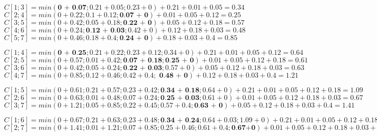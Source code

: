 \documentclass[11pt]{article}
\begin{document}
\bigskip

$C[1; 3] = min(\textbf{0 + 0.07} ; 0.21 + 0.05; 0.23 + 0) + 0.21 + 0.01 + 0.05= 0.34$\\ \smallskip
$C[2; 4] = min(0 + 0.22 ; 0.1 + 0.12; \textbf{0.07 + 0}) + 0.01 + 0.05 + 0.12= 0.25$\\ \smallskip
$C[3; 5] = min(0 + 0.42 ; 0.05 + 0.18; \textbf{0.22 + 0}) + 0.05 + 0.12 + 0.18= 0.57$\\ \smallskip
$C[4; 6] = min(0 + 0.24 ; \textbf{0.12 + 0.03}; 0.42 + 0) + 0.12 + 0.18 + 0.03= 0.48$\\ \smallskip
$C[5; 7] = min(0 + 0.46 ; 0.18 + 0.4 ;\textbf{0.24 + 0}) + 0.18 + 0.03 + 0.4= 0.85$\\

\bigskip

$C[1; 4] = min(\textbf{0 + 0.25} ; 0.21 + 0.22; 0.23 + 0.12;  0.34 + 0) + 0.21 + 0.01 + 0.05 + 0.12= 0.64$\\ \smallskip
$C[2; 5] = min(0 + 0.57 ; 0.01 + 0.42; \textbf{0.07 + 0.18}; \textbf{0.25 + 0}) + 0.01 + 0.05 + 0.12 + 0.18= 0.61$\\ \smallskip
$C[3; 6] = min(0 + 0.42 ; 0.05 + 0.24; \textbf{0.22 + 0.03}; 0.57 + 0) + 0.05 + 0.12 + 0.18 + 0.03= 0.63$\\ \smallskip
$C[4; 7] = min(0 + 0.85 ; 0.12 + 0.46; 0.42 + 0.4 ;\textbf{ 0.48 + 0}) + 0.12 + 0.18 + 0.03 + 0.4 = 1.21$\\

\bigskip

$C[1; 5] = min(0 + 0.61 ; 0.21 + 0.57; 0.23 + 0.42; \textbf{0.34 + 0.18} ; 0.64+0) + 0.21 + 0.01 + 0.05 + 0.12 + 0.18 = 1.09$\\ \smallskip
$C[2; 6] = min(0 + 0.63 ; 0.01 + 0.48; 0.07 + 0.24; \textbf{0.25 + 0.03}; 0.61 +0) + 0.01 + 0.05 + 0.12 + 0.18 +0.03= 0.67$\\ \smallskip
$C[3; 7] = min(0 + 1.21 ; 0.05 + 0.85; 0.22 + 0.45; 0.57+0.4; \textbf{0.63 + 0}) + 0.05 + 0.12 + 0.18 + 0.03+ 0.4= 1.41$\\

\bigskip

$C[1; 6] = min(0 + 0.67 ; 0.21 + 0.63; 0.23 + 0.48; \textbf{0.34 + 0.24} ; 0.64+0.03; 1.09 + 0) + 0.21 + 0.01 + 0.05 + 0.12 + 0.18 + 0.03= 1.18$\\ \smallskip
$C[2; 7] = min(0 + 1.41 ; 0.01 + 1.21; 0.07 + 0.85; 0.25 + 0.46; 0.61 +0.4; \textbf{0.67+0}) + 0.01 + 0.05 + 0.12 + 0.18 +0.03 + 0.4= 1.46$\\


\bigskip
\end{document}
